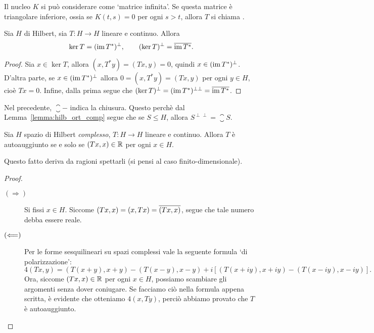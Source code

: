 \begin{remark}
	Il nucleo $K$ si può considerare come `matrice infinita'. Se questa matrice è triangolare inferiore, ossia se $K(t,s) = 0$ per ogni $s>t$, allora $T$ si chiama .
\end{remark}

\begin{lemma}
	Sia $H$ di Hilbert, sia $T : H \to H$ lineare e continuo.
	Allora
	\begin{equation*}
		\ker T = (\operatorname{im} T^*)^\perp, \qquad (\ker T)^\perp = \overline{\operatorname{im} T^*}.
	\end{equation*}
\end{lemma}
\begin{proof}
	Sia $x \in \ker T$, allora $(x, T^*y) = (Tx, y)=0$, quindi $x \in (\operatorname{im} T^*)^\perp$.
	D'altra parte, se $x \in (\operatorname{im} T^*)^\perp$ allora $0 = (x, T^*y) = (Tx,y)$ per ogni $y \in H$, cioè $Tx = 0$.
	Infine, dalla prima segue che $(\ker T)^\perp = (\operatorname{im} T^*)^{\perp\perp} = \overline{\operatorname{im} T^*}$.
\end{proof}

\begin{remark}
	Nel precedente, $\closure{-}$ indica la chiusura. Questo perchè dal Lemma~\ref{lemma:hilb_ort_comp} segue che se $S \leq H$, allora $S^{\perp\perp} = \closure{S}$.
\end{remark}

\begin{theorem}
	Sia $H$ spazio di Hilbert \emph{complesso}, $T:H \to H$ lineare e continuo.
	Allora $T$ è autoauggiunto se e solo se $(Tx, x) \in \mathbb{R}$ per ogni $x \in H$.
\end{theorem}
\begin{remark}
	Questo fatto deriva da ragioni spettarli (si pensi al caso finito-dimensionale).
\end{remark}
\begin{proof}
	\leavevmode
	\begin{description}
		\item[$(\Longrightarrow)$] Si fissi $x \in H$. Siccome $(Tx,x) = (x,Tx) = \overline{(Tx,x)}$, segue che tale numero debba essere reale.
		\item[$(\Longleftarrow)$] Per le forme sesquilineari su spazi complessi vale la seguente formula `di polarizzazione':
		\begin{equation*}
			4 (Tx,y) = (T(x+y),x+y) - (T(x-y), x-y) + i\left[ (T(x+iy),x+iy) - (T(x-iy), x-iy) \right].
		\end{equation*}
		Ora, siccome $(Tx,x) \in \mathbb{R}$ per ogni $x \in H$, possiamo scambiare gli argomenti senza dover coniugare. Se facciamo ciò nella formula appena scritta, è evidente che otteniamo $4(x,Ty)$, perciò abbiamo provato che $T$ è autoauggiunto.
	\end{description}
\end{proof}

